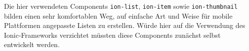 Die hier verwendeten Components \texttt{ion-list}, \texttt{ion-item} sowie \texttt{ion-thumbnail} bilden einen sehr komfortablen Weg, auf einfache Art und Weise für mobile Plattformen angepasste Listen zu erstellen. Würde hier auf die Verwendung des Ionic-Frameworks verzichtet müssten diese Components zunächst selbst entwickelt werden.
%
%
%

